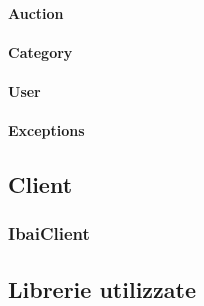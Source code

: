 \paragraph{Auction}
\paragraph{Category}
\paragraph{User}
\paragraph{Exceptions}
\subsection{Client}
\subsubsection{IbaiClient}
\subsection{Librerie utilizzate}
